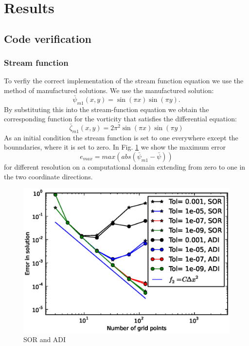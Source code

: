 \section{Results}
\subsection{Code verification}
\subsubsection{Stream function}
To verfiy the correct implementation of the stream function equation we use the method of manufactured solutions. We use the manufactured solution:
\begin{equation}
\bar{\psi}_{m1}(x,y) = \sin(\pi x) \sin(\pi y).
\end{equation}
By substituting this into the stream-function equation we obtain the corresponding function for the vorticity that satisfies the differential equation:
\begin{equation}
\bar{\zeta}_{m1}(x,y) = 2 \pi^2 \sin(\pi x) \sin(\pi y) 
\end{equation}
As an initial condition the stream function is set to one everywhere except the bounndaries, where it is set to zero.
In Fig. \ref{fig:code_verification_sf} we show the maximum error 
\begin{equation}
e_{max} = max(abs(\bar{\psi}_{m1} - \bar{\psi}))
\end{equation}
for different resolution on a computational domain extending from zero to one in the two coordinate directions.
%
\begin{figure}[H]
\centering
\includegraphics[scale=0.8]{"figs/code_verification_tol"}
\caption{SOR and ADI}
\label{fig:code_verification_sf}
\end{figure}
